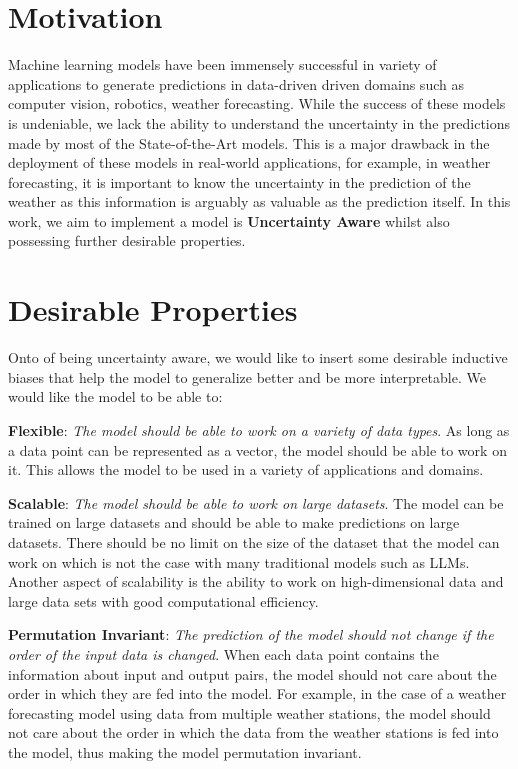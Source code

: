 \documentclass[../../main.tex]{subfiles}
\begin{document}
\section{Motivation}

Machine learning models have been immensely successful in variety of applications to generate predictions in data-driven driven domains such as computer vision, robotics, weather forecasting. While the success of these models is undeniable, we lack the ability to understand the uncertainty in the predictions made by most of the State-of-the-Art models. This is a major drawback in the deployment of these models in real-world applications, for example, in weather forecasting, it is important to know the uncertainty in the prediction of the weather as this information is arguably as valuable as the prediction itself. In this work, we aim to implement a model is \textbf{Uncertainty Aware} whilst also possessing further desirable properties.

\section{Desirable Properties}

Onto of being uncertainty aware, we would like to insert some desirable inductive biases that help the model to generalize better and be more interpretable. We would like the model to be able to:

\textbf{Flexible}: \emph{The model should be able to work on a variety of data types}. As long as a data point can be represented as a vector, the model should be able to work on it. This allows the model to be used in a variety of applications and domains.

\textbf{Scalable}: \emph{The model should be able to work on large datasets}. The model can be trained on large datasets and should be able to make predictions on large datasets. There should be no limit on the size of the dataset that the model can work on which is not the case with many traditional models such as LLMs. Another aspect of scalability is the ability to work on high-dimensional data and large data sets with good computational efficiency.


\textbf{Permutation Invariant}: \emph{The prediction of the model should not change if the order of the input data is changed}. When each data point contains the information about input and output pairs, the model should not care about the order in which they are fed into the model. For example, in the case of a weather forecasting model using data from multiple weather stations, the model should not care about the order in which the data from the weather stations is fed into the model, thus making the model permutation invariant.
\end{document}
